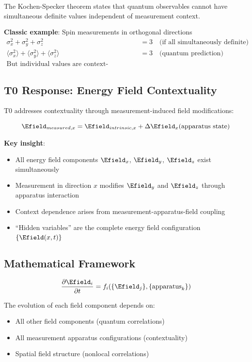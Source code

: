 	The Kochen-Specker theorem states that quantum observables cannot have simultaneous definite values independent of measurement context.
	
	\textbf{Classic example}: Spin measurements in orthogonal directions
	\begin{align}
		\sigma_x^2 + \sigma_y^2 + \sigma_z^2 &= 3 \quad \text{(if all simultaneously definite)} \\
		\langle\sigma_x^2\rangle + \langle\sigma_y^2\rangle + \langle\sigma_z^2\rangle &= 3 \quad \text{(quantum prediction)} \\
		\text{But individual values are context-dependent!}
	\end{align}
	
	\subsection{T0 Response: Energy Field Contextuality}
	
	T0 addresses contextuality through measurement-induced field modifications:
	
	\begin{equation}
		\Efield_{measured,x} = \Efield_{intrinsic,x} + \Delta\Efield_x(\text{apparatus state})
	\end{equation}
	
	\textbf{Key insight}: 
	\begin{itemize}
		\item All energy field components $\Efield_x$, $\Efield_y$, $\Efield_z$ exist simultaneously
		\item Measurement in direction $x$ modifies $\Efield_y$ and $\Efield_z$ through apparatus interaction
		\item Context dependence arises from measurement-apparatus-field coupling
		\item ``Hidden variables'' are the complete energy field configuration $\{\Efield(x,t)\}$
	\end{itemize}
	
	\subsection{Mathematical Framework}
	
	\begin{equation}
		\frac{\partial \Efield_i}{\partial t} = f_i(\{\Efield_j\}, \{\text{apparatus}_k\})
	\end{equation}
	
	The evolution of each field component depends on:
	\begin{itemize}
		\item All other field components (quantum correlations)
		\item All measurement apparatus configurations (contextuality)
		\item Spatial field structure (nonlocal correlations)
	\end{itemize}
	
